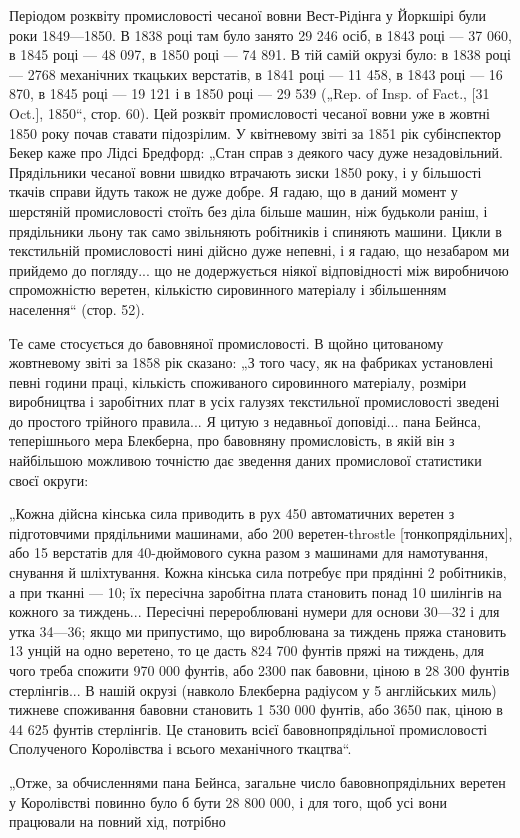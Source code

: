 Періодом розквіту промисловості чесаної вовни Вест-Рідінга
у Йоркшірі були роки 1849—1850. В 1838 році там було занято
29 246 осіб, в 1843 році — 37 060, в 1845 році — 48 097, в 1850 році —
74 891. В тій самій окрузі було: в 1838 році — 2768 механічних
ткацьких верстатів, в 1841 році — 11 458, в 1843 році — 16 870,
в 1845 році — 19 121 і в 1850 році — 29 539 („Rep. of Insp. of Fact.,
[31 Oct.], 1850“, стор. 60). Цей розквіт промисловості чесаної
вовни уже в жовтні 1850 року почав ставати підозрілим. У квітневому
звіті за 1851 рік субінспектор Бекер каже про Лідсі Бредфорд:
„Стан справ з деякого часу дуже незадовільний. Прядільники
чесаної вовни швидко втрачають зиски 1850 року, і у більшості
ткачів справи йдуть також не дуже добре. Я гадаю, що
в даний момент у шерстяній промисловості стоїть без діла більше
машин, ніж будьколи раніш, і прядільники льону так само звільняють
робітників і спиняють машини. Цикли в текстильній промисловості
нині дійсно дуже непевні, і я гадаю, що незабаром
ми прийдемо до погляду... що не додержується ніякої відповідності
між виробничою спроможністю веретен, кількістю сировинного
матеріалу і збільшенням населення“ (стор. 52).

Те саме стосується до бавовняної промисловості. В щойно
цитованому жовтневому звіті за 1858 рік сказано: „З того часу,
як на фабриках установлені певні години праці, кількість споживаного
сировинного матеріалу, розміри виробництва і заробітних
плат в усіх галузях текстильної промисловості зведені
до простого трійного правила... Я цитую з недавньої доповіді...
пана Бейнса, теперішнього мера Блекберна, про бавовняну промисловість,
в якій він з найбільшою можливою точністю дає
зведення даних промислової статистики своєї округи:

„Кожна дійсна кінська сила приводить в рух 450 автоматичних
веретен з підготовчими прядільними машинами, або 200 веретен-throstle
[тонкопрядільних], або 15 верстатів для 40-дюймового
сукна разом з машинами для намотування, снування й
шліхтування. Кожна кінська сила потребує при прядінні 2  робітників,
а при тканні — 10; їх пересічна заробітна плата становить
понад 10   шилінгів на кожного за тиждень... Пересічні
перероблювані нумери для основи 30—32 і для утка 34—36;
якщо ми припустимо, що вироблювана за тиждень пряжа становить
13 унцій на одно веретено, то це дасть 824 700 фунтів
пряжі на тиждень, для чого треба спожити 970 000 фунтів, або
2300 пак бавовни, ціною в 28 300 фунтів стерлінгів... В нашій
окрузі (навколо Блекберна радіусом у 5 англійських миль)
тижневе споживання бавовни становить 1 530 000 фунтів, або
3650 пак, ціною в 44 625 фунтів стерлінгів. Це становить 
всієї бавовнопрядільної промисловості Сполученого Королівства
і   всього механічного ткацтва“.

„Отже, за обчисленнями пана Бейнса, загальне число бавовнопрядільних
веретен у Королівстві повинно було б бути 28 800 000,
і для того, щоб усі вони працювали на повний хід, потрібно
\parbreak{}  %

